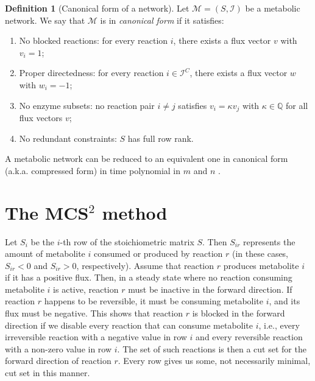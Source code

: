 \documentclass{bioinfo}
\theoremstyle{plain}
\theoremstyle{definition}
\newtheorem{definition}{Definition} %
\begin{document}
\begin{definition} [Canonical form of a network] 
Let $\mathcal{M} = (S, \mathcal{I})$ be a metabolic network. We say that $\mathcal{M}$ is in \emph{canonical form} if it satisfies:
\begin{enumerate}
    \item No blocked reactions: for every reaction $i$, there exists a flux vector $v$ with $v_i = 1$;
    \item Proper directedness: for every reaction $i \in \mathcal{I}^{C}$, there exists a flux vector $w$ with $w_i = -1$;
    \item No enzyme subsets: no reaction pair $i \neq j$ satisfies $v_i = \kappa v_j$ with $\kappa \in \mathbb{Q}$ for all flux vectors $v$;
    \item No redundant constraints: $S$ has full row rank.
\end{enumerate}
A metabolic network can be reduced to an equivalent one in canonical form (a.k.a. compressed form) in time polynomial in $m$ and $n$ \cite{Thesis}.
\end{definition}



\section{The MCS$^2$ method}

Let $S_i$ be the $i$-th row of the stoichiometric matrix $S$. 
Then $S_{ir}$ represents the amount %
of metabolite $i$ consumed or produced by reaction $r$ (in these cases, $S_{ir} < 0$ and $S_{ir} > 0$, respectively). 
Assume that reaction $r$ produces metabolite $i$ if it has a positive flux. Then, in a steady state where no reaction consuming metabolite $i$ is active, reaction $r$ must be inactive in the forward direction. If reaction $r$ happens to be reversible, it must be consuming metabolite $i$, and its flux must be negative. This shows that reaction $r$ is blocked in the forward direction if we disable every reaction that can consume metabolite $i$, i.e., every irreversible reaction with a negative value in row $i$ and every reversible reaction with a non-zero value in row $i$. The set of such reactions is then a cut set for the forward direction of reaction $r$. Every row gives us some, not necessarily minimal, cut set in this manner.
\end{document}
